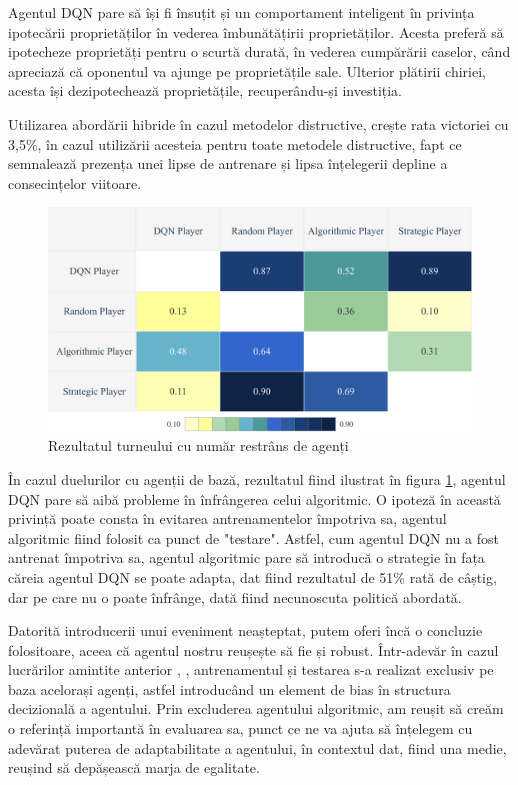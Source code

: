 Agentul DQN pare să își fi însuțit și un comportament inteligent în privința ipotecării proprietăților în vederea îmbunătățirii proprietăților. Acesta preferă să ipotecheze proprietăți pentru o scurtă durată, în vederea cumpărării caselor, când apreciază că oponentul va ajunge pe proprietățile sale. Ulterior plătirii chiriei, acesta își dezipotechează proprietățile, recuperându-și investiția.

Utilizarea abordării hibride în cazul metodelor distructive, crește rata victoriei cu 3,5\%, în cazul utilizării acesteia pentru toate metodele distructive, fapt ce semnalează prezența unei lipse de antrenare și lipsa înțelegerii depline a consecințelor viitoare.

\begin{figure}[H]
    \centering
    \includegraphics[width=13cm]{images/mini-tournament-dqn.png}
    \caption{Rezultatul turneului cu număr restrâns de agenți}
    \label{fig:mini-tournament-results}
\end{figure}

În cazul duelurilor cu agenții de bază, rezultatul fiind ilustrat în figura \ref{fig:mini-tournament-results}, agentul DQN pare să aibă probleme în înfrângerea celui algoritmic. O ipoteză în această privință poate consta în evitarea antrenamentelor împotriva sa, agentul algoritmic fiind folosit ca punct de "testare". Astfel, cum agentul DQN nu a fost antrenat împotriva sa, agentul algoritmic pare să introducă o strategie în fața căreia agentul DQN se poate adapta, dat fiind rezultatul de 51\% rată de câștig, dar pe care nu o poate înfrânge, dată fiind necunoscuta politică abordată.

Datorită introducerii unui eveniment neașteptat, putem oferi încă o concluzie folositoare, aceea că agentul nostru reușește să fie și robust. Într-adevăr în cazul lucrărilor amintite anterior \cite{mdp_monopoly_2}, \cite{hybrid_monopoly}, antrenamentul și testarea s-a realizat exclusiv pe baza acelorași agenți, astfel introducând un element de bias în structura decizională a agentului. Prin excluderea agentului algoritmic, am reușit să creăm o referință importantă în evaluarea sa, punct ce ne va ajuta să înțelegem cu adevărat puterea de adaptabilitate a agentului, în contextul dat, fiind una medie, reușind să depășească marja de egalitate.

